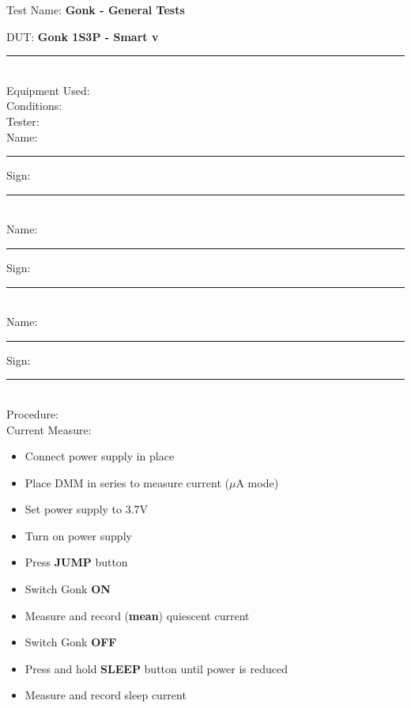 {\Huge Test Name: \textbf{Gonk - General Tests}}\\[20pt]
{\Large DUT: \textbf{Gonk 1S3P - Smart v}\rule{1cm}{0.15mm}} \\[10pt]
{\Large Equipment Used: }\\[40pt]
{\Large Conditions: }\\[40pt]
{\Large Tester: }\\[10pt]
Name: \rule{4cm}{0.15mm} \hfill Sign: \rule{4cm}{0.15mm}\\[5pt]
Name: \rule{4cm}{0.15mm} \hfill Sign: \rule{4cm}{0.15mm}\\[5pt]
Name: \rule{4cm}{0.15mm} \hfill Sign: \rule{4cm}{0.15mm}\\[15pt]
{\Large Procedure: }\\

{\large Current Measure:}
\begin{itemize}
\item Connect power supply in place 
\item Place DMM in series to measure current ($\mu \text{A}$ mode)
\item Set power supply to 3.7V
\item Turn on power supply
\item Press \textbf{JUMP} button
\item Switch Gonk \textbf{ON}
\item Measure and record (\textbf{mean}) quiescent current 
\item Switch Gonk \textbf{OFF}
\item Press and hold \textbf{SLEEP} button until power is reduced 
\item Measure and record sleep current 
\end{itemize}

